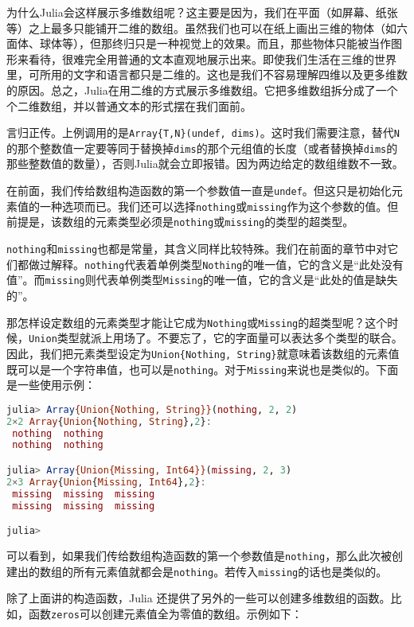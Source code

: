 为什么Julia会这样展示多维数组呢？这主要是因为，我们在平面（如屏幕、纸张等）之上最多只能铺开二维的数组。虽然我们也可以在纸上画出三维的物体（如六面体、球体等），但那终归只是一种视觉上的效果。而且，那些物体只能被当作图形来看待，很难完全用普通的文本直观地展示出来。即使我们生活在三维的世界里，可所用的文字和语言都只是二维的。这也是我们不容易理解四维以及更多维数的原因。总之，Julia在用二维的方式展示多维数组。它把多维数组拆分成了一个个二维数组，并以普通文本的形式摆在我们面前。

言归正传。上例调用的是\verb|Array{T,N}(undef, dims)|。这时我们需要注意，替代\verb|N|的那个整数值一定要等同于替换掉\verb|dims|的那个元组值的长度（或者替换掉\verb|dims|的那些整数值的数量），否则Julia就会立即报错。因为两边给定的数组维数不一致。

在前面，我们传给数组构造函数的第一个参数值一直是\verb|undef|。但这只是初始化元素值的一种选项而已。我们还可以选择\verb|nothing|或\verb|missing|作为这个参数的值。但前提是，该数组的元素类型必须是\verb|nothing|或\verb|missing|的类型的超类型。

\verb|nothing|和\verb|missing|也都是常量，其含义同样比较特殊。我们在前面的章节中对它们都做过解释。\verb|nothing|代表着单例类型\verb|Nothing|的唯一值，它的含义是“此处没有值”。而\verb|missing|则代表单例类型\verb|Missing|的唯一值，它的含义是“此处的值是缺失的”。

那怎样设定数组的元素类型才能让它成为\verb|Nothing|或\verb|Missing|的超类型呢？这个时候，\verb|Union|类型就派上用场了。不要忘了，它的字面量可以表达多个类型的联合。因此，我们把元素类型设定为\verb|Union{Nothing, String}|就意味着该数组的元素值既可以是一个字符串值，也可以是\verb|nothing|。对于\verb|Missing|来说也是类似的。下面是一些使用示例：

\begin{lstlisting}[language=julia]
julia> Array{Union{Nothing, String}}(nothing, 2, 2)
2×2 Array{Union{Nothing, String},2}:
 nothing  nothing
 nothing  nothing

julia> Array{Union{Missing, Int64}}(missing, 2, 3)
2×3 Array{Union{Missing, Int64},2}:
 missing  missing  missing
 missing  missing  missing

julia> 
\end{lstlisting}

可以看到，如果我们传给数组构造函数的第一个参数值是\verb|nothing|，那么此次被创建出的数组的所有元素值就都会是\verb|nothing|。若传入\verb|missing|的话也是类似的。

除了上面讲的构造函数，Julia 还提供了另外的一些可以创建多维数组的函数。比如，函数\verb|zeros|可以创建元素值全为零值的数组。示例如下：

